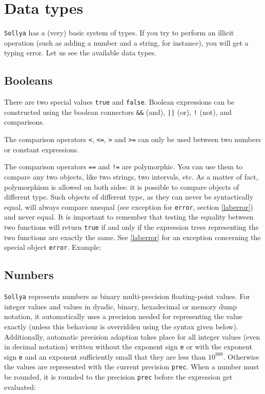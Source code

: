 \documentclass[a4paper]{article}
\newcommand{\com}[1]{\texttt{#1}}
\newcommand{\key}[1]{\texttt{#1}}
\newcommand{\sollya}{\texttt{Sollya}\xspace}
\begin{document}
\section{Data types}
\sollya has a (very) basic system of types. If you try to perform an illicit operation (such as adding a number and a string, for instance), you will get a typing error. Let us see the available data types.

\subsection{Booleans}
There are two special values \key{true} and \key{false}. Boolean expressions can be constructed using the boolean connectors \key{\&\&} (and), \key{||} (or), \key{!} (not), and comparisons.

The comparison operators \key{<}, \key{<=}, \key{>} and \key{>=} can only be used between two numbers or constant expressions.

The comparison operators \key{==} and \key{!=} are polymorphic. You can use them to compare any two objects, like two strings, two intervals, etc. As a matter of fact, polymorphism is allowed on both sides: it is possible to compare objects of different type. Such objects of different type, as they can never be syntactically equal, will always compare unequal (see exception for \key{error}, section \ref{laberror}) and never equal. It is important to remember that testing the equality between two functions will return \key{true} if and only if the expression trees representing the two functions are exactly the same. See \ref{laberror} for an exception concerning the special object \key{error}. Example:



\subsection{Numbers} \label{sec:numbers}
\sollya represents numbers as binary multi-precision floating-point values. For integer values and values in dyadic, binary, hexadecimal or memory dump notation, it 
automatically uses a precision needed for representing the value exactly (unless this behaviour is overridden using the syntax given below). Additionally, automatic precision adaption takes place for all 
integer values (even in decimal notation) written without the exponent sign \texttt{e} or with the exponent sign \texttt{e} and an exponent sufficiently 
small that they are less than $10^{999}$. Otherwise the values are represented with the current precision \com{prec}. When a number must be rounded, it is rounded to the precision \com{prec} before the expression get evaluated:
\end{document}
